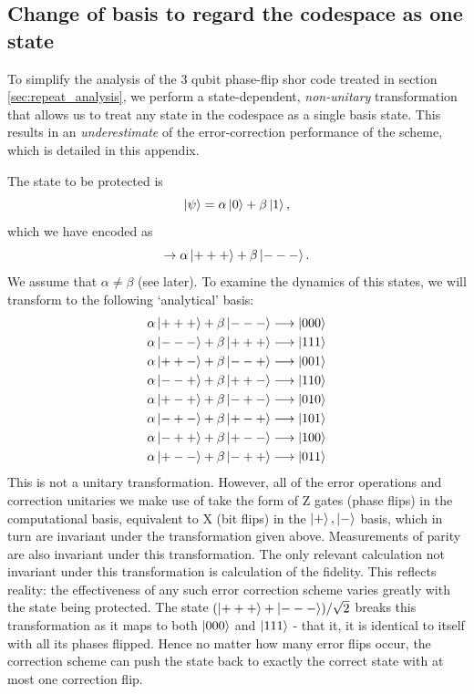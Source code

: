 \documentclass{report}
\begin{document}
\begin{appendices}
\chapter{Change of basis to regard the codespace as one state}\label{appendix:changeofbasis}
To simplify the analysis of the 3 qubit phase-flip shor code treated in section \ref{sec:repeat_analysis}, we perform a state-dependent, \textit{non-unitary} transformation that allows us to treat any state in the codespace as a single basis state. This results in an \textit{underestimate} of the error-correction performance of the scheme, which is detailed in this appendix.

The state to be protected is
\begin{equation*}
    \ket{\psi} = \alpha \ket{0} + \beta \ket{1},
\end{equation*} which we have encoded as
\begin{equation*}
    \rightarrow \alpha \ket{+++} + \beta \ket{---}.
\end{equation*}
We assume that $\alpha \neq \beta$ (see later). To examine the dynamics of this states, we will transform to the following `analytical' basis:
\begin{align*}
    \alpha \ket{+++} + \beta \ket{---} &\longrightarrow \ket{000}\\
    \alpha \ket{---} + \beta \ket{+++} &\longrightarrow \ket{111}\\
    \alpha \ket{++-} + \beta \ket{--+} &\longrightarrow \ket{001}\\
    \alpha \ket{--+} + \beta \ket{++-} &\longrightarrow \ket{110}\\
    \alpha \ket{+-+} + \beta \ket{-+-} &\longrightarrow \ket{010}\\
    \alpha \ket{-+-} + \beta \ket{+-+} &\longrightarrow \ket{101}\\
    \alpha \ket{-++} + \beta \ket{+--} &\longrightarrow \ket{100}\\
    \alpha \ket{+--} + \beta \ket{-++} &\longrightarrow \ket{011}
\end{align*}
This is not a unitary transformation. However, all of the error operations and correction unitaries we make use of take the form of Z gates (phase flips) in the computational basis, equivalent to X (bit flips) in the $\ket{+},\ket{-}$ basis, which in turn are invariant under the transformation given above. Measurements of parity are also invariant under this transformation. The only relevant calculation not invariant under this transformation is calculation of the fidelity. This reflects reality: the effectiveness of any such error correction scheme varies greatly with the state being protected. The state $(\ket{+++} + \ket{---})/\sqrt{2}$ breaks this transformation as it maps to both $\ket{000}$ and $\ket{111}$ - that it, it is identical to itself with all its phases flipped. Hence no matter how many error flips occur, the correction scheme can push the state back to exactly the correct state with at most one correction flip.


\end{appendices}
\end{document}
